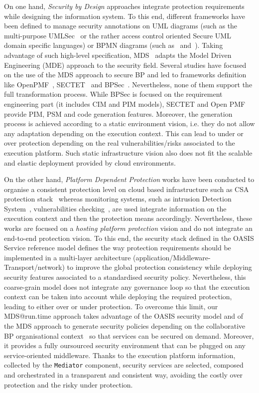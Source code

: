 \documentclass[runningheads,a4paper]{llncs}
\begin{document}
On one hand, \textit{Security by Design} approaches integrate protection requirements while designing the information system. To this end, different frameworks have been defined to manage security annotations on UML diagrams (such as the multi-purpose UMLSec~\cite{JJ02} or the rather access control oriented  Secure UML~\cite{LBD02} domain specific languages) or BPMN diagrams (such as~\cite{WMS09} and~\cite{SSL09}). Taking advantage of such high-level specification, MDS~\cite{LS09}\cite{LZN14} adapts the Model Driven Engineering (MDE) approach to the security field. Several studies have focused on the use of the MDS approach to secure BP and led to frameworks definition like OpenPMF~\cite{LU10}, SECTET~\cite{AHB08} and BPSec~\cite{RFP07}. Nevertheless, none of them support the full transformation process. While BPSec is focused on the requirement engineering part (it includes CIM and PIM models), SECTET and Open PMF provide PIM, PSM and code generation features. Moreover, the generation process is achieved according to a static environment vision, i.e. they do not allow any adaptation depending on the execution context. This can lead to under or over protection depending on the real vulnerabilities/risks associated to the execution platform. Such static infrastructure vision also does not fit the scalable and elastic deployment provided by cloud environments.

On the other hand, \textit{Platform Dependent Protection} works have been conducted to organise a consistent protection level on cloud based infrastructure such as CSA protection stack~\cite{CSA11} whereas monitoring systems, such as intrusion Detection System~\cite{MPB12}, vulnerabilities checking~\cite{AVG11}, are used integrate information on the execution context and then the protection means accordingly. Nevertheless, these works are focused on a \textit{hosting platform protection} vision and do not integrate an end-to-end protection vision. To this end, the security stack defined in the OASIS Service reference model defines the way protection requirements should be implemented in a multi-layer architecture (application/Middleware-Transport/network) to improve the global protection consistency while deploying security features associated to a standardised security policy. Nevertheless, this coarse-grain model does not integrate any governance loop so that the execution context can be taken into account while deploying the required protection, leading to either over or under protection.
To overcome this limit, our MDS@run.time approach takes advantage of the OASIS security model and of the MDS approach to generate security policies depending on the collaborative BP organisational context~\cite{OFG13} so that services can be secured on demand. Moreover, it provides a fully oursourced security environment that can be plugged on any service-oriented middleware. Thanks to the execution platform information, collected by the \texttt{Mediator} component, security services are selected, composed and orchestrated in a transparent and consistent way, avoiding the costly over protection and the risky under protection.
\end{document}
